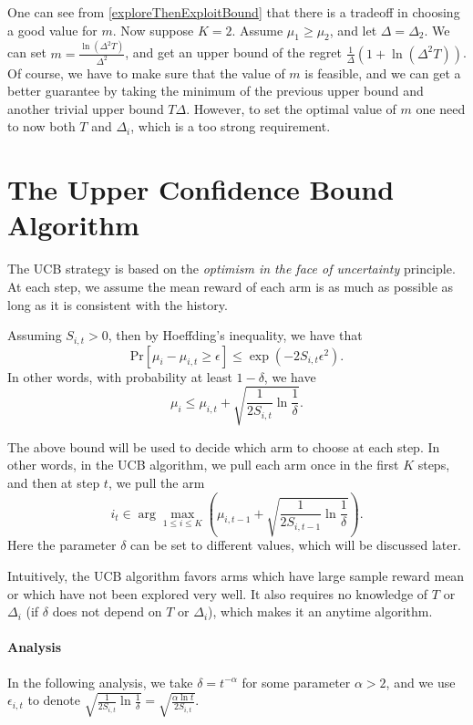 \documentclass[openany]{book}
\theoremstyle{definition}
\theoremstyle{remark}
\begin{document}
One can see from \eqref{exploreThenExploitBound} that there is a tradeoff in choosing a good value for $m$. Now suppose $K=2$. Assume $\mu_1\ge\mu_2$, and let $\Delta=\Delta_2$. We can set $m=\frac{\ln(\Delta^2T)}{\Delta^2}$, and get an upper bound of the regret $\frac{1}{\Delta}(1+\ln(\Delta^2T))$. Of course, we have to make sure that the value of $m$ is feasible, and we can get a better guarantee by taking the minimum of the previous upper bound and another trivial upper bound $T\Delta$. However, to set the optimal value of $m$ one need to now both $T$ and $\Delta_i$, which is a too strong requirement.

\section{The Upper Confidence Bound Algorithm}
The UCB strategy is based on the \emph{optimism in the face of uncertainty} principle. At each step, we assume the mean reward of each arm is as much as possible as long as it is consistent with the history.

Assuming $S_{i,t}>0$, then by Hoeffding's inequality, we have that
\begin{equation}
    \mathrm{Pr}[\mu_i-\mu_{i,t}\ge\epsilon]\le\exp(-2S_{i,t}\epsilon^2).
\end{equation}
In other words, with probability at least $1-\delta$, we have
\begin{equation}\label{UCB}
    \mu_i\le\mu_{i,t}+\sqrt{\frac{1}{2S_{i,t}}\ln \frac{1}{\delta}}.
\end{equation}

The above bound will be used to decide which arm to choose at each step. In other words, in the UCB algorithm, we pull each arm once in the first $K$ steps, and then at step $t$, we pull the arm
\begin{equation}
    i_t\in\arg\max_{1\le i\le K}\left(\mu_{i,t-1}+\sqrt{\frac{1}{2S_{i,t-1}}\ln \frac{1}{\delta}}\right).
\end{equation}
Here the parameter $\delta$ can be set to different values, which will be discussed later.

Intuitively, the UCB algorithm favors arms which have large sample reward mean or which have not been explored very well. It also requires no knowledge of $T$ or $\Delta_i$ (if $\delta$ does not depend on $T$ or $\Delta_i$), which makes it an anytime algorithm.

\paragraph{Analysis}
In the following analysis, we take $\delta=t^{-\alpha}$ for some parameter $\alpha>2$, and we use $\epsilon_{i,t}$ to denote $\sqrt{\frac{1}{2S_{i,t}}\ln \frac{1}{\delta}}=\sqrt{\frac{\alpha\ln t}{2S_{i,t}}}$.
\end{document}
